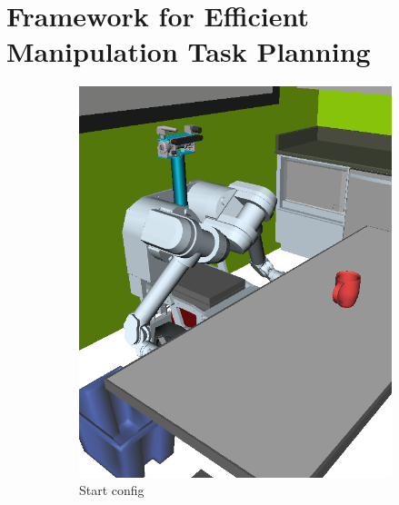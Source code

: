 \chapter{Framework for Efficient Manipulation Task Planning}
\label{chap:proposal-framework}

{
\setlength{\offsetpage}{0.5in}
\begin{figure}
\begin{widepage}
\centering

   \begin{subfigure}[t]{0.19\linewidth}
      \centering
      \includegraphics[width=\columnwidth]{figs/testherb-a.png}
      \caption{Start config}
   \end{subfigure}
   \begin{subfigure}[t]{0.19\linewidth}
      \centering

\end{subfigure}
\end{widepage}
\end{figure}}

